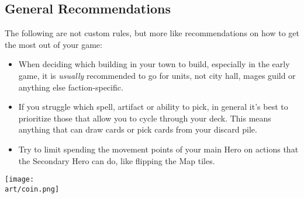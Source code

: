 \begin{multicols}{2}

\subsection*{General Recommendations}

The following are not custom rules, but more like recommendations on how to get the most out of your game:
\begin{itemize}
  \item When deciding which building in your town to build, especially in the early game, it is \textit{usually} recommended to go for units, not city hall, mages guild or anything else faction-specific.
  \item If you struggle which spell, artifact or ability to pick, in general it's best to prioritize those that allow you to cycle through your deck.
    This means anything that can draw cards or pick cards from your discard pile.
  \item Try to limit spending the movement points of your main Hero on actions that the Secondary Hero can do, like flipping the Map tiles.
\end{itemize}

\begin{center}
  \texttt{[image: \\art/coin.png]}
\end{center}

\end{multicols}
